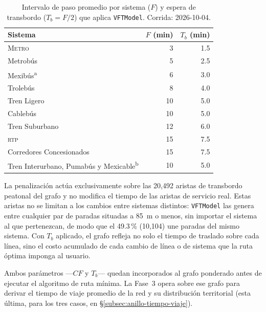 \begin{table}[H]
    \centering
    \caption[Intervalo de paso y espera de transbordo por sistema]{%
    Intervalo de paso promedio por sistema ($F$) y espera de transbordo
    ($T_b = F/2$) que aplica \texttt{VFTModel}. Corrida: 2026-10-04.}
    \label{tab:tb-sistemas}
    \small
    \begin{tabular}{lrr}
        \toprule
        \textbf{Sistema} & \textbf{$F$ (min)} & \textbf{$T_b$ (min)} \\
        \midrule
        \textsc{Metro}            &  3 & 1.5 \\
        Metrobús                  &  5 & 2.5 \\
        Mexibús\textsuperscript{a} &  6 & 3.0 \\
        Trolebús                  &  8 & 4.0 \\
        Tren Ligero               & 10 & 5.0 \\
        Cablebús                  & 10 & 5.0 \\
        Tren Suburbano            & 12 & 6.0 \\
        \textsc{rtp}              & 15 & 7.5 \\
        Corredores Concesionados  & 15 & 7.5 \\
        Tren Interurbano, Pumabús y Mexicable\textsuperscript{b} & 10 & 5.0 \\
        \bottomrule
    \end{tabular}
    \vspace{0.4em}


\end{table}

La penalización actúa exclusivamente sobre las 20{,}492 aristas de transbordo
peatonal del grafo y no modifica el tiempo de las aristas de servicio real.
Estas aristas no se limitan a los cambios entre sistemas distintos: \texttt{VFTModel} las
genera entre cualquier par de paradas situadas a 85~m o menos, sin importar el
sistema al que pertenezcan, de modo que el 49.3\,\% (10{,}104) une paradas del
mismo sistema. Con $T_b$ aplicado, el grafo refleja no solo el tiempo de
traslado sobre cada línea, sino el costo acumulado de cada cambio de línea o de
sistema que la ruta óptima imponga al usuario.

Ambos parámetros —$CF$ y $T_b$— quedan incorporados al grafo ponderado antes de
ejecutar el algoritmo de ruta mínima. La Fase~3 opera sobre ese grafo para
derivar el tiempo de viaje promedio de la red y su distribución territorial
(esta última, para los tres casos, en §\ref{subsec:anillo-tiempo-viaje}).

